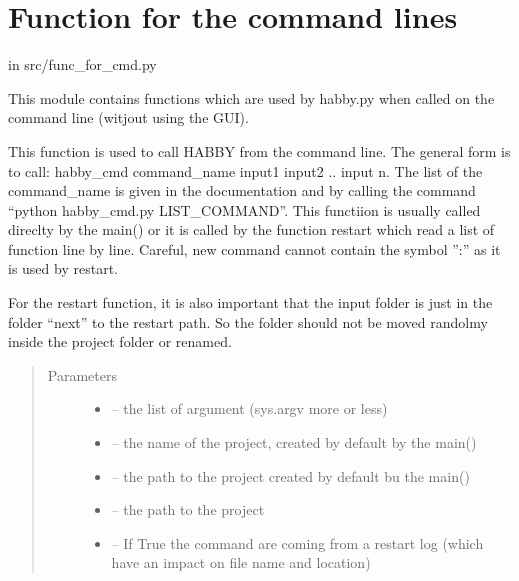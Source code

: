 \documentclass[letterpaper,10pt,english]{sphinxmanual}
\begin{document}
\section{Function for the command lines}
\label{\detokenize{index:function-for-the-command-lines}}
in src/func\_for\_cmd.py

This module contains functions which are used by habby.py when called on the command line (witjout using the GUI).
\label{\detokenize{index:module-src.func_for_cmd}}

\begin{fulllineitems}
\label{\detokenize{index:src.func_for_cmd.all_command}}
This function is used to call HABBY from the command line. The general form is to call:
habby\_cmd command\_name input1 input2 .. input n. The list of the command\_name is given in the documentation and by
calling the command ``python habby\_cmd.py LIST\_COMMAND''. This functiion is usually called direclty by the main()
or it is called by the function restart which read a list of function line by line. Careful, new command cannot
contain the symbol '':'' as it is used by restart.

For the restart function, it is also important that the input folder is just in the folder ``next'' to the restart
path. So the folder should not be moved randolmy inside the project folder or renamed.
\begin{quote}\begin{description}
\item[{Parameters}] \leavevmode\begin{itemize}
\item {} 
 -- the list of argument (sys.argv more or less)

\item {} 
 -- the name of the project, created by default by the main()

\item {} 
 -- the path to the project created by default bu the main()

\item {} 
 -- the path to the project

\item {} 
 -- If True the command are coming from a restart log (which have an impact on file name and
location)

\end{itemize}

\end{description}\end{quote}

\end{fulllineitems}
\end{document}
